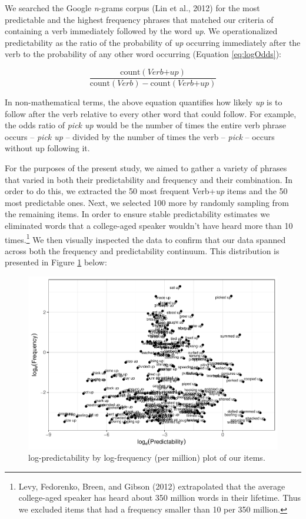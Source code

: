 \documentclass[
  man,floatsintext]{apa6}
\begin{document}
We searched the Google \emph{n}-grams corpus (Lin et al., 2012) for the most predictable and the highest frequency phrases that matched our criteria of containing a verb immediately followed by the word \emph{up}. We operationalized predictability as the ratio of the probability of \emph{up} occurring immediately after the verb to the probability of any other word occurring (Equation \eqref{eq:logOdds}):

\begin{equation}
\label{eq:logOdds}
\frac{\mathrm{count(\textit{Verb+up})}}{\mathrm{count(\textit{Verb})} - \mathrm{count(\textit{Verb+up})}} 
\end{equation}

In non-mathematical terms, the above equation quantifies how likely \emph{up} is to follow after the verb relative to every other word that could follow. For example, the odds ratio of \emph{pick up} would be the number of times the entire verb phrase occurs -- \emph{pick up} -- divided by the number of times the verb -- \emph{pick} -- occurs without up following it.

For the purposes of the present study, we aimed to gather a variety of phrases that varied in both their predictability and frequency and their combination. In order to do this, we extracted the 50 most frequent Verb+\emph{up} items and the 50 most predictable ones. Next, we selected 100 more by randomly sampling from the remaining items. In order to ensure stable predictability estimates we eliminated words that a college-aged speaker wouldn't have heard more than 10 times.\footnote{Levy, Fedorenko, Breen, and Gibson (2012) extrapolated that the average college-aged speaker has heard about 350 million words in their lifetime. Thus we excluded items that had a frequency smaller than 10 per 350 million.} We then visually inspected the data to confirm that our data spanned across both the frequency and predictability continuum. This distribution is presented in Figure \ref{fig:stimplot2} below:

\begin{figure}

{\centering \includegraphics[width=0.8\linewidth]{write-up_files/figure-latex/stimplot2-1} 

}

\caption{log-predictability by log-frequency (per million) plot of our items.}\label{fig:stimplot2}
\end{figure}
\end{document}
